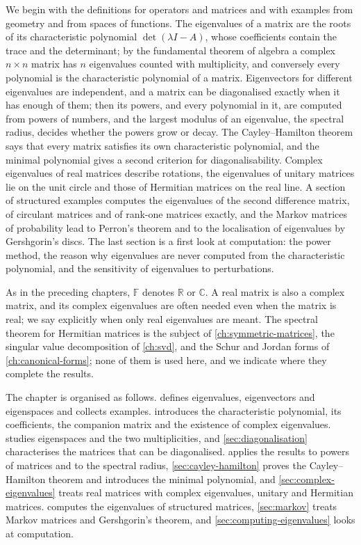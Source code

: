 We begin with the definitions for operators and matrices and with examples from geometry and from spaces of functions. The eigenvalues of a matrix are the roots of its characteristic polynomial $\det(\lambda I-A)$, whose coefficients contain the trace and the determinant; by the fundamental theorem of algebra a complex $n\times n$ matrix has $n$ eigenvalues counted with multiplicity, and conversely every polynomial is the characteristic polynomial of a matrix. Eigenvectors for different eigenvalues are independent, and a matrix can be diagonalised exactly when it has enough of them; then its powers, and every polynomial in it, are computed from powers of numbers, and the largest modulus of an eigenvalue, the spectral radius, decides whether the powers grow or decay. The Cayley--Hamilton theorem says that every matrix satisfies its own characteristic polynomial, and the minimal polynomial gives a second criterion for diagonalisability. Complex eigenvalues of real matrices describe rotations, the eigenvalues of unitary matrices lie on the unit circle and those of Hermitian matrices on the real line. A section of structured examples computes the eigenvalues of the second difference matrix, of circulant matrices and of rank-one matrices exactly, and the Markov matrices of probability lead to Perron's theorem and to the localisation of eigenvalues by Gershgorin's discs. The last section is a first look at computation: the power method, the reason why eigenvalues are never computed from the characteristic polynomial, and the sensitivity of eigenvalues to perturbations.

As in the preceding chapters, $\mathbb F$ denotes $\mathbb R$ or $\mathbb C$. A real matrix is also a complex matrix, and its complex eigenvalues are often needed even when the matrix is real; we say explicitly when only real eigenvalues are meant. The spectral theorem for Hermitian matrices is the subject of \cref{ch:symmetric-matrices}, the singular value decomposition of \cref{ch:svd}, and the Schur and Jordan forms of \cref{ch:canonical-forms}; none of them is used here, and we indicate where they complete the results.

The chapter is organised as follows.  defines eigenvalues, eigenvectors and eigenspaces and collects examples.  introduces the characteristic polynomial, its coefficients, the companion matrix and the existence of complex eigenvalues.  studies eigenspaces and the two multiplicities, and \cref{sec:diagonalisation} characterises the matrices that can be diagonalised.  applies the results to powers of matrices and to the spectral radius, \cref{sec:cayley-hamilton} proves the Cayley--Hamilton theorem and introduces the minimal polynomial, and \cref{sec:complex-eigenvalues} treats real matrices with complex eigenvalues, unitary and Hermitian matrices.  computes the eigenvalues of structured matrices, \cref{sec:markov} treats Markov matrices and Gershgorin's theorem, and \cref{sec:computing-eigenvalues} looks at computation.

